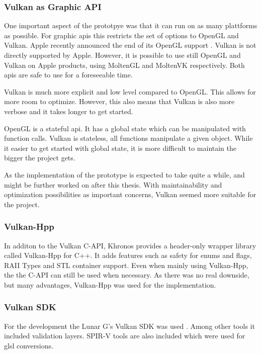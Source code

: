 \subsubsection{Vulkan as Graphic API}
One important aspect of the prototpye was that it can run on as many plattforms as possible. %
For graphic \glspl{api} this restricts the set of options to OpenGL and Vulkan. Apple recently announced the end of its OpenGL support \cite{arstechnica:openGL}. Vulkan is not directly supported by Apple. However, it is possible to use still OpenGL and Vulkan on Apple products, using MoltenGL \cite{moltenGL} and MoltenVK \cite{moltenVK} respectively. Both \glspl{api} are safe to use for a foreseeable time.

Vulkan is much more explicit and low level compared to OpenGL. This allows for more room to optimize. However, this also means that Vulkan is also more verbose and it takes longer to get started.

OpenGL is a stateful \gls{api}. It has a global state which can be manipulated with function calls. Vulkan is stateless, all functions manipulate a given object. While it easier to get started with global state, it is more difficult to maintain the bigger the project gets.

As the implementation of the prototype is expected to take quite a while, and might be further worked on after this thesis. With maintainability and optimization possibilities as important concerns, Vulkan seemed more suitable for the project. 


\subsubsection{Vulkan-Hpp}
In additon to the Vulkan C-API, Khronos provides a header-only wrapper library called Vulkan-Hpp for C++. It adds features such as safety for enums and flags, RAII Types and STL container support. Even when mainly using Vulkan-Hpp, the the C-API can still be used when necessary. As there was no real downside, but many advantages, Vulkan-Hpp was used for the implementation.


\subsubsection{Vulkan SDK}
For the development the Lunar G's Vulkan SDK was used \cite{lunarg:vulkansdk}. Among other tools it included validation layers. SPIR-V tools are also included which were used for \gls{glsl} conversions.

